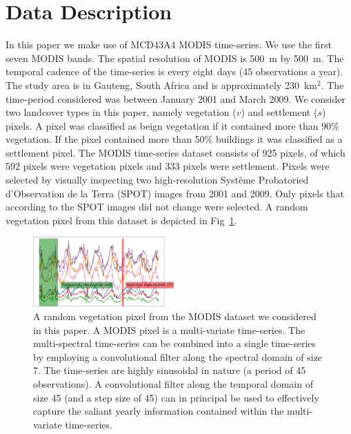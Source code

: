 \documentclass{article}
\begin{document}
\section{Data Description}
\label{sec:data}
In this paper we make use of MCD43A4 MODIS time-series. We use the first seven MODIS bands. The spatial resolution of MODIS is 500~m by 500~m. The temporal cadence of the time-series is every eight days (45 observations a year). The study area is in Gauteng, South Africa and is approximately 230~km$^2$. The time-period considered was between January 2001 and March 2009. We consider two landcover types in this paper, namely vegetation ($v$) and settlement ($s$) pixels. A pixel was classified as beign vegetation if it contained more than 90\% vegetation. If the pixel contained more than 50\% buildings it was classified as a settlement pixel. 
The MODIS time-series dataset consists of 925 pixels, of which 592 pixels were vegetation pixels and 333 pixels were settlement. Pixels were selected by visually inspecting two high-resolution Syst\`{e}me Probatoried d'Observation de la Terra (SPOT) images from 2001 and 2009. Only pixels that according to the SPOT images did not change were selected. A random vegetation pixel from this dataset is depicted in Fig~\ref{fig:mv_series}. 

\begin{figure}
  \includegraphics[width=0.48\textwidth]{time_series-crop.pdf}
  \caption{A random vegetation pixel from the MODIS dataset we considered in this paper. A MODIS pixel is a multi-variate time-series. The multi-spectral time-series can be combined into a single time-series by employing a convolutional filter along the spectral domain of size 7. The time-series are highly sinusoidal in nature (a period of 45 observations). A convolutional filter along the temporal domain of size 45 (and a step size of 45) can in principal be used to effectively capture the saliant yearly information contained within the multi-variate time-series.}
 \label{fig:mv_series} 
 \end{figure}
 
\end{document}
